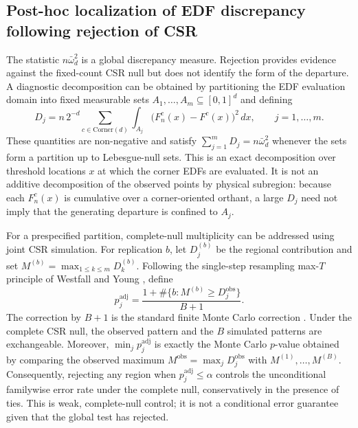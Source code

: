 \documentclass[pdflatex]{sn-jnl}
\theoremstyle{thmstyleone}
\theoremstyle{thmstyletwo}
\theoremstyle{thmstylethree}
\begin{document}
\subsection{Post-hoc localization of EDF discrepancy following rejection of CSR}\label{sec:posthoc}

The statistic $n\bar\omega_d^2$ is a global discrepancy measure. Rejection provides evidence against the fixed-count CSR null but does not identify the form of the departure. A diagnostic decomposition can be obtained by partitioning the EDF evaluation domain into fixed measurable sets $A_1,\dots,A_m\subseteq[0,1]^d$ and defining
\begin{equation}\label{eq:regional-contribution}
  D_j
  =n\,2^{-d}\sum_{c\in\mathrm{Corner}(d)}
    \int_{A_j}\bigl(F_n^c(x)-F^c(x)\bigr)^2\,dx,
  \qquad j=1,\dots,m.
\end{equation}
These quantities are non-negative and satisfy $\sum_{j=1}^m D_j=n\bar\omega_d^2$ whenever the sets form a partition up to Lebesgue-null sets. This is an exact decomposition over threshold locations $x$ at which the corner EDFs are evaluated. It is not an additive decomposition of the observed points by physical subregion: because each $F_n^c(x)$ is cumulative over a corner-oriented orthant, a large $D_j$ need not imply that the generating departure is confined to $A_j$.

For a prespecified partition, complete-null multiplicity can be addressed using joint CSR simulation. For replication $b$, let $D_j^{(b)}$ be the regional contribution and set $M^{(b)}=\max_{1\le k\le m}D_k^{(b)}$. Following the single-step resampling max-$T$ principle of Westfall and Young \cite{WestfallYoung1993}, define
\begin{equation}\label{eq:maxT-adjusted}
  p_j^{\mathrm{adj}}
  =\frac{1+\#\{b:M^{(b)}\ge D_j^{\mathrm{obs}}\}}{B+1}.
\end{equation}
The correction by $B+1$ is the standard finite Monte Carlo correction \cite{PhipsonSmyth2010}. Under the complete CSR null, the observed pattern and the $B$ simulated patterns are exchangeable. Moreover, $\min_jp_j^{\mathrm{adj}}$ is exactly the Monte Carlo $p$-value obtained by comparing the observed maximum $M^{\mathrm{obs}}=\max_jD_j^{\mathrm{obs}}$ with $M^{(1)},\dots,M^{(B)}$. Consequently, rejecting any region when $p_j^{\mathrm{adj}}\le\alpha$ controls the unconditional familywise error rate under the complete null, conservatively in the presence of ties. This is weak, complete-null control; it is not a conditional error guarantee given that the global test has rejected.
\end{document}
